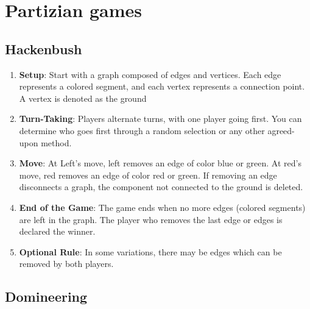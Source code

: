 \documentclass[12pt,oneside]{book}
\begin{document}
\chapter{Partizian games}
\section{Hackenbush}
\begin{enumerate}
    \item \textbf{Setup}: Start with a graph composed of edges and vertices. Each edge represents a colored segment, and each vertex represents a connection point. A vertex is denoted as the ground
  
    \item \textbf{Turn-Taking}: Players alternate turns, with one player going first. You can determine who goes first through a random selection or any other agreed-upon method.
  
    \item \textbf{Move}: At Left's move, left removes an edge of color blue or green. At red's move, red removes an edge of color red or green. If removing an edge  disconnects a graph, the component not connected to the ground is deleted.
  
    \item \textbf{End of the Game}: The game ends when no more edges (colored segments) are left in the graph. The player who removes the last edge or edges is declared the winner.
  
    \item \textbf{Optional Rule}: In some variations, there may be edges which can be removed by both players.
\end{enumerate}
\section{Domineering}
\end{document}
